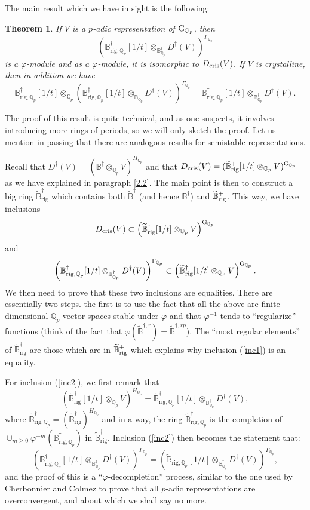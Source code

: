 \documentclass[11pt]{amsart}
\def\Q{{\mathbb Q}_p}
\def\g{{\rm G}_{\Q}}
\def\Qp{{\mathbb Q}_p}
\newcommand{\btdag}[1]{\widetilde{\mathbb{B}}^{\dagger #1}}
\newcommand{\bdag}[1]{\mathbb{B}^{\dagger #1}}
\newcommand{\btrig}[2]{\widetilde{\mathbb{B}}^{\dagger #1}_{\mathrm{rig} #2}}
\newcommand{\bnrig}[2]{\mathbb{B}^{\dagger #1}_{\mathrm{rig} #2}}
\def\bcontp{\widetilde{\mathbb{B}}^+_{\rm rig}}
\def\dcris{D_{\rm cris}}
\renewcommand{\ddag}[1]{D^{\dagger #1}}
\newtheorem{thm}[definit]{\bf{Theorem}}
\begin{document}
The main result which we have in sight is the following:  
 
\begin{thm}\label{rpaeqd} 
If $V$ is a 
$p$-adic representation of $\g$, then \[ \left(\bnrig{}{,\Q}[1/t] 
\otimes_{\bdag{}_{\Q}} \ddag{}(V) \right)^{\Gamma_{\Q}} \] is a 
$\varphi$-module and as a $\varphi$-module, it is isomorphic to 
$\dcris(V)$. If $V$ is crystalline, then in addition we have  
\[ \bnrig{}{,\Q}[1/t] 
\otimes_{\Q} \left(\bnrig{}{,\Q}[1/t] 
\otimes_{\bdag{}_{\Q}} \ddag{}(V) \right)^{\Gamma_{\Q}}  = \bnrig{}{,\Q}[1/t] 
\otimes_{\bdag{}_{\Q}} \ddag{}(V). \] 
\end{thm} 
 
The proof of this result is quite technical, and as one suspects, it 
involves introducing more rings of periods, so we will only sketch the 
proof. Let us mention in passing that there are analogous results for 
semistable representations.  
 
Recall that $\ddag{}(V) = (\bdag{} 
\otimes_{\Qp} V)^{H_{\Q}}$ and that $\dcris(V) = (\bcontp[1/t] \otimes_{\Qp} 
V)^{\g}$ as we have explained in paragraph \ref{2.2}.  
The main point is then to construct a big ring $\btrig{}{}$ which 
contains both $\btdag{}$ (and hence $\bdag{}$) and $\bcontp$. This 
way, we have inclusions  
\begin{equation}\label{inc1}  
\dcris(V) \subset \left( \btrig{}{}[1/t] \otimes_{\Qp} V 
\right)^{\g} 
\end{equation} 
and  
\begin{equation}\label{inc2} \left(\bnrig{}{,\Q}[1/t] 
\otimes_{\bdag{}_{\Q}} \ddag{}(V) \right)^{\Gamma_{\Q}} 
\subset \left( \btrig{}{}[1/t] \otimes_{\Qp} V \right)^{\g}. 
\end{equation} 
We then need to prove that these two inclusions are 
equalities. There are essentially two steps. the first is to use the 
fact that all the above are finite dimensional $\Q$-vector spaces 
stable under $\varphi$ and that $\varphi^{-1}$ tends to ``regularize'' 
functions (think of the fact that $\varphi(\btdag{,r}) = 
\btdag{,rp}$). The ``most regular elements'' of $\btrig{}{}$ are those 
which are in $\bcontp$ which explains why inclusion (\ref{inc1}) is an 
equality.  
 
For inclusion (\ref{inc2}), we first remark that \[ (\btrig{}{}[1/t] 
\otimes_{\Qp} V)^{H_{\Q}} = \btrig{}{,\Q}[1/t] \otimes_{\bdag{}_{\Q}} 
\ddag{}(V), \] where $\btrig{}{,\Q} = (\btrig{}{})^{H_{\Q}}$ and in a 
way,  the ring $\btrig{}{,\Q}$ is the completion of $\cup_{m \geq 0} 
\varphi^{-m}(\bnrig{}{,\Q})$ in $\btrig{}{}$. Inclusion (\ref{inc2}) then 
becomes the statement that: 
\[ \left(\bnrig{}{,\Q}[1/t] 
\otimes_{\bdag{}_{\Q}} \ddag{}(V) \right)^{\Gamma_{\Q}} 
 = \left(\btrig{}{,\Q}[1/t] 
\otimes_{\bdag{}_{\Q}} \ddag{}(V) \right)^{\Gamma_{\Q}},\] 
and the proof of this is a ``$\varphi$-decompletion'' process, similar to 
the one used by Cherbonnier and Colmez to prove that all $p$-adic 
representations are overconvergent, and about which we shall say no 
more.  
 
\end{document}
